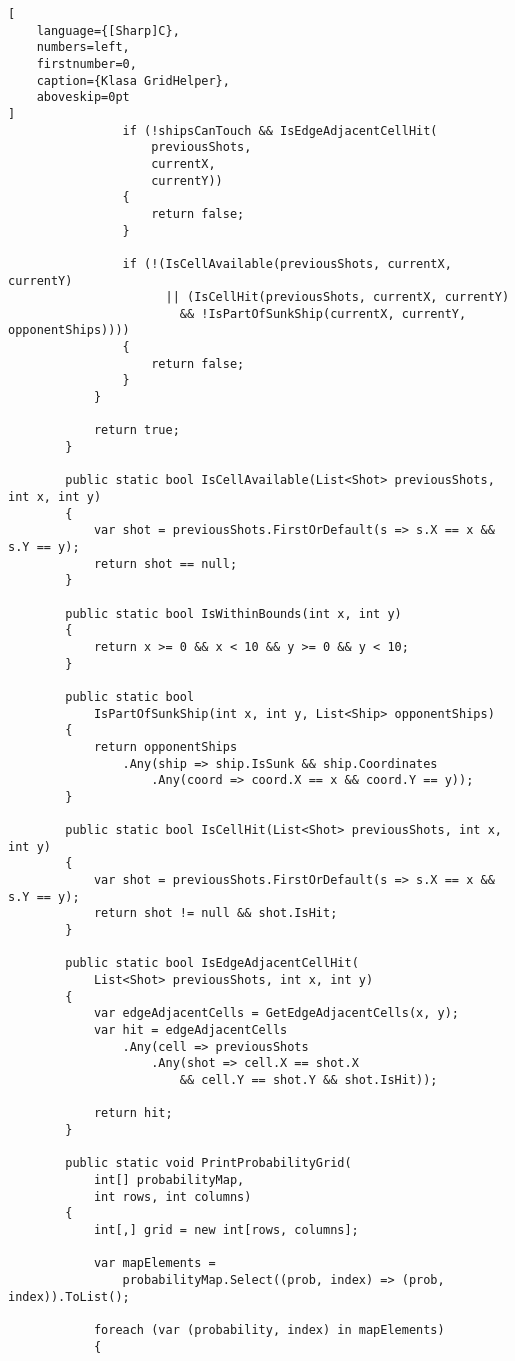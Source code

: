 \begin{addmargin}[0mm]{0mm}
\begin{lstlisting}[
    language={[Sharp]C},
    numbers=left,
    firstnumber=0,
    caption={Klasa GridHelper},
    aboveskip=0pt
]
                if (!shipsCanTouch && IsEdgeAdjacentCellHit(
                    previousShots,
                    currentX,
                    currentY))
                {
                    return false;
                }

                if (!(IsCellAvailable(previousShots, currentX, currentY)
                      || (IsCellHit(previousShots, currentX, currentY)
                        && !IsPartOfSunkShip(currentX, currentY, opponentShips))))
                {
                    return false;
                }
            }

            return true;
        }

        public static bool IsCellAvailable(List<Shot> previousShots, int x, int y)
        {
            var shot = previousShots.FirstOrDefault(s => s.X == x && s.Y == y);
            return shot == null;
        }

        public static bool IsWithinBounds(int x, int y)
        {
            return x >= 0 && x < 10 && y >= 0 && y < 10;
        }

        public static bool 
            IsPartOfSunkShip(int x, int y, List<Ship> opponentShips)
        {
            return opponentShips
                .Any(ship => ship.IsSunk && ship.Coordinates
                    .Any(coord => coord.X == x && coord.Y == y));
        }        

        public static bool IsCellHit(List<Shot> previousShots, int x, int y)
        {
            var shot = previousShots.FirstOrDefault(s => s.X == x && s.Y == y);
            return shot != null && shot.IsHit;
        }

        public static bool IsEdgeAdjacentCellHit(
            List<Shot> previousShots, int x, int y)
        {
            var edgeAdjacentCells = GetEdgeAdjacentCells(x, y);
            var hit = edgeAdjacentCells
                .Any(cell => previousShots
                    .Any(shot => cell.X == shot.X 
                        && cell.Y == shot.Y && shot.IsHit));

            return hit;
        }

        public static void PrintProbabilityGrid(
            int[] probabilityMap,
            int rows, int columns)
        {
            int[,] grid = new int[rows, columns];

            var mapElements =
                probabilityMap.Select((prob, index) => (prob, index)).ToList();

            foreach (var (probability, index) in mapElements)
            {


\end{lstlisting}
\end{addmargin}

